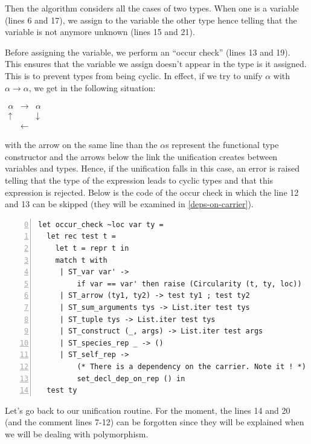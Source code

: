 Then the algorithm considers all the cases of two types. When one is a
variable (lines 6 and 17), we assign to the variable the other type
hence telling that the variable is not anymore unknown (lines 15 and
21).

Before assigning the variable, we perform an ``occur check''
(lines 13 and 19). This ensures that the variable we assign doesn't
appear in the type is it assigned. This is to prevent types from being
cyclic. In effect, if we try to unify $\alpha$ with $\alpha
\rightarrow \alpha$, we get in the following situation:

\noindent
\begin{math}
\begin{array}{ccc}
\alpha     & \rightarrow & \alpha \\
 \uparrow  &             & \downarrow  \\
           & \leftarrow &
\end{array}
\end{math}

\noindent with the arrow on the same line than the $\alpha$s
represent the functional type constructor and the arrows below the
link the unification creates between variables and types. Hence, if
the unification falls in this case, an error is raised telling that
the type of the expression leads to cyclic types and that this
expression is rejected. Below is the code of the occur check in which
the line 12 and 13 can be skipped (they will be examined in 
\ref{deps-on-carrier}).

\label{occur-check-source-code}
{\footnotesize
\begin{lstlisting}[language=MyOCaml,numbers=left, firstnumber=0,
                   title=Occur check routine]
let occur_check ~loc var ty =
  let rec test t =
    let t = repr t in
    match t with
     | ST_var var' ->
         if var == var' then raise (Circularity (t, ty, loc))
     | ST_arrow (ty1, ty2) -> test ty1 ; test ty2
     | ST_sum_arguments tys -> List.iter test tys
     | ST_tuple tys -> List.iter test tys
     | ST_construct (_, args) -> List.iter test args
     | ST_species_rep _ -> ()
     | ST_self_rep ->
         (* There is a dependency on the carrier. Note it ! *)
         set_decl_dep_on_rep () in
  test ty
\end{lstlisting}
}

Let's go back to our unification routine. For the moment, the lines 14
and 20 (and the comment lines 7-12) can be forgotten since they will
be explained when we will be dealing with polymorphism.

